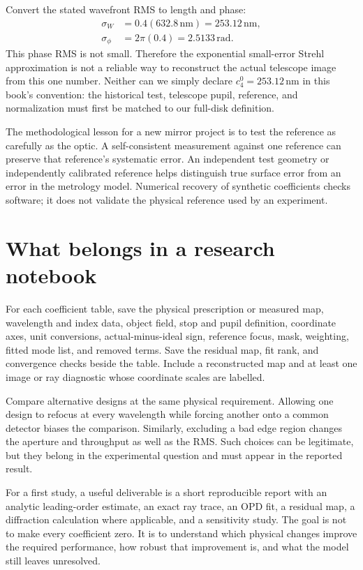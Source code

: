Convert the stated wavefront RMS to length and phase:
\begin{align}
 \sigma_W&=0.4(632.8\,\mathrm{nm})=253.12\,\mathrm{nm},\\
 \sigma_\phi&=2\pi(0.4)=2.5133\,\mathrm{rad}.
\end{align}
This phase RMS is not small. Therefore the exponential small-error
Strehl approximation is not a reliable way to reconstruct the actual
telescope image from this one number. Neither can we simply declare
$c_4^0=253.12\,\mathrm{nm}$ in this book's convention: the historical
test, telescope pupil, reference, and normalization must first be
matched to our full-disk definition.

The methodological lesson for a new mirror project is to test the
reference as carefully as the optic. A self-consistent measurement
against one reference can preserve that reference's systematic error.
An independent test geometry or independently calibrated reference
helps distinguish true surface error from an error in the metrology
model. Numerical recovery of synthetic coefficients checks software;
it does not validate the physical reference used by an experiment.

\section{What belongs in a research notebook}
For each coefficient table, save the physical prescription or measured
map, wavelength and index data, object field, stop and pupil definition,
coordinate axes, unit conversions, actual-minus-ideal sign, reference
focus, mask, weighting, fitted mode list, and removed terms. Save the
residual map, fit rank, and convergence checks beside the table.
Include a reconstructed map and at least one image or ray diagnostic
whose coordinate scales are labelled.

Compare alternative designs at the same physical requirement. Allowing
one design to refocus at every wavelength while forcing another onto
a common detector biases the comparison. Similarly, excluding a bad
edge region changes the aperture and throughput as well as the RMS.
Such choices can be legitimate, but they belong in the experimental
question and must appear in the reported result.

For a first study, a useful deliverable is a short reproducible report
with an analytic leading-order estimate, an exact ray trace, an OPD
fit, a residual map, a diffraction calculation where applicable, and
a sensitivity study. The goal is not to make every coefficient zero.
It is to understand which physical changes improve the required
performance, how robust that improvement is, and what the model
still leaves unresolved.

